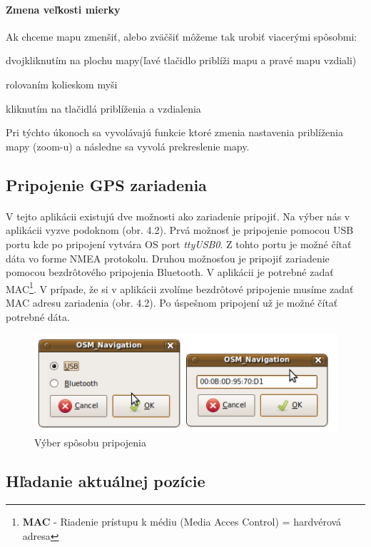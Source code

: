 \paragraph{Zmena veľkosti mierky}
Ak chceme mapu zmenšiť, alebo zväčšiť môžeme tak urobiť viacerými spôsobmi:
\begin{list}{•}
\item dvojkliknutím na plochu mapy(ľavé tlačidlo priblíži mapu a pravé mapu vzdiali)
\item
\item rolovaním kolieskom myši 
\item kliknutím na tlačidlá priblíženia a vzdialenia
\end{list}
Pri týchto úkonoch sa vyvolávajú funkcie ktoré zmenia nastavenia priblíženia mapy (zoom-u) a následne sa vyvolá prekreslenie mapy.

\subsection{Pripojenie GPS zariadenia}
\paragraph{}
V tejto aplikácii existujú dve možnosti ako zariadenie pripojiť. Na výber nás v aplikácii vyzve podoknom (obr. 4.2). Prvá možnosť je pripojenie pomocou USB portu kde po pripojení vytvára OS port \textit{ttyUSB0}. Z tohto portu je možné čítať dáta vo forme NMEA protokolu. Druhou možnosťou je pripojiť zariadenie pomocou bezdrôtového pripojenia Bluetooth. V aplikácii je potrebné zadať MAC\footnote{\textbf{MAC} - Riadenie prístupu k médiu (Media Acces Control) = hardvérová adresa}. V prípade, že si v aplikácii zvolíme bezdrôtové pripojenie musíme zadať MAC adresu zariadenia (obr. 4.2). Po úspešnom pripojení už je možné čítať potrebné dáta.
\begin{figure}[ht]
\centering
\includegraphics[width=12.5cm]{obr/volba_pris}
\caption{Výber spôsobu pripojenia}
\end{figure}


\subsection{Hľadanie aktuálnej pozície}
